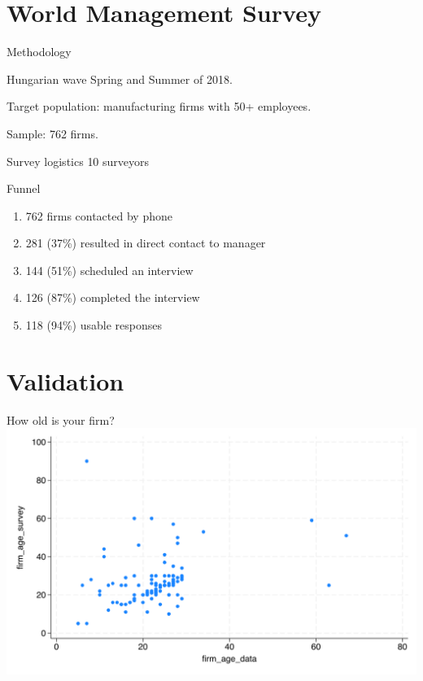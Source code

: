 \documentclass[
  ignorenonframetext,
  aspectratio=1610,
]{beamer}
\providecommand{\tightlist}{%
  \setlength{\itemsep}{0pt}\setlength{\parskip}{0pt}}
\begin{document}
\section{World Management Survey}\label{world-management-survey}

\begin{frame}{Methodology}
\protect\hypertarget{methodology}{}
\end{frame}

\begin{frame}{Hungarian wave}
\protect\hypertarget{hungarian-wave}{}
Spring and Summer of 2018.

Target population: manufacturing firms with 50+ employees.

Sample: 762 firms.
\end{frame}

\begin{frame}{Survey logistics}
\protect\hypertarget{survey-logistics}{}
10 surveyors

\begin{block}{Funnel}
\protect\hypertarget{funnel}{}
\begin{enumerate}
\tightlist
\item
  762 firms contacted by phone
\item
  281 (37\%) resulted in direct contact to manager
\item
  144 (51\%) scheduled an interview
\item
  126 (87\%) completed the interview
\item
  118 (94\%) usable responses
\end{enumerate}
\end{block}
\end{frame}

\section{Validation}\label{validation}

\begin{frame}{How old is your firm?}
\protect\hypertarget{how-old-is-your-firm}{}
\includegraphics{fig/firm_age_validation.png}
\end{frame}
\end{document}
